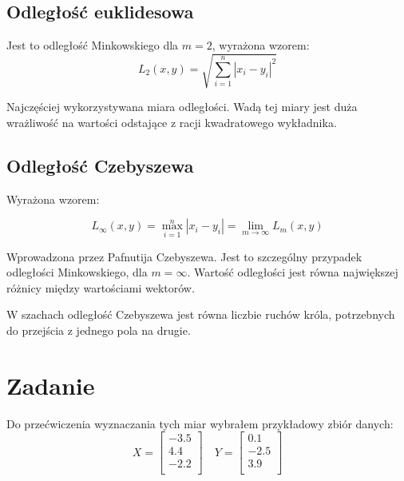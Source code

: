\documentclass{article}
\begin{document}
\subsection{Odległość euklidesowa}
Jest to odległość Minkowskiego dla $m=2$, wyrażona wzorem:
\begin{equation}
    L_2(x, y) = \sqrt{\sum_{i=1}^{n} |x_i - y_i|^2}
\end{equation}

Najczęściej wykorzystywana miara odległości. Wadą tej miary jest
duża wrażliwość na wartości odstające z racji kwadratowego wykładnika.

\subsection{Odległość Czebyszewa}
Wyrażona wzorem:

\begin{equation}
    L_\infty(x, y) = \max_{i=1}^{n} |x_i - y_i| = \lim_{m \to \infty} L_m(x, y)
\end{equation}

Wprowadzona przez Pafnutija Czebyszewa. Jest to szczególny
przypadek odległości Minkowskiego, dla $m=\infty$. Wartość odległości
jest równa największej różnicy między wartościami wektorów.

W szachach odległość Czebyszewa jest równa liczbie ruchów króla, potrzebnych
do przejścia z jednego pola na drugie.

\section{Zadanie}

Do przećwiczenia wyznaczania tych miar wybrałem przykładowy zbiór danych:
\begin{equation}
    X = 
    \begin{bmatrix}
        -3.5 \\
        4.4 \\
        -2.2 \\
    \end{bmatrix} \quad
    Y =
    \begin{bmatrix}
        0.1 \\
        -2.5 \\
        3.9 \\
    \end{bmatrix}
\end{equation}
\end{document}

